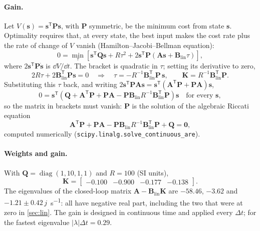 \paragraph{Gain.} Let $V(\bm s) = \bm s^{\mathsf T}\bm P\bm s$, with $\bm P$
symmetric, be the minimum cost from state $\bm s$. Optimality requires that, at
every state, the best input makes the cost rate plus the rate of change of $V$
vanish (Hamilton--Jacobi--Bellman equation):
\begin{equation}
  0 = \min_\tau\left[\bm s^{\mathsf T}\bm Q\bm s + R\tau^2
      + 2\bm s^{\mathsf T}\bm P\left(\bm A\bm s + \bm B_{\mathrm{lin}}\tau\right)\right] ,
\end{equation}
where $2\bm s^{\mathsf T}\bm P\dot{\bm s}$ is $\dd V/\dd t$. The bracket is
quadratic in $\tau$; setting its derivative to zero,
\begin{equation}
  2R\tau + 2\bm B_{\mathrm{lin}}^{\mathsf T}\bm P\bm s = 0
  \quad\Rightarrow\quad
  \tau = -R^{-1}\bm B_{\mathrm{lin}}^{\mathsf T}\bm P\,\bm s ,
  \qquad \bm K = R^{-1}\bm B_{\mathrm{lin}}^{\mathsf T}\bm P .
\end{equation}
Substituting this $\tau$ back, and writing
$2\bm s^{\mathsf T}\bm P\bm A\bm s = \bm s^{\mathsf T}(\bm A^{\mathsf T}\bm P + \bm P\bm A)\bm s$,
\begin{equation}
  0 = \bm s^{\mathsf T}\left(\bm Q + \bm A^{\mathsf T}\bm P + \bm P\bm A
      - \bm P\bm B_{\mathrm{lin}}R^{-1}\bm B_{\mathrm{lin}}^{\mathsf T}\bm P\right)\bm s
  \quad\text{for every } \bm s ,
\end{equation}
so the matrix in brackets must vanish: $\bm P$ is the solution of the
algebraic Riccati equation
\begin{equation}
  \bm A^{\mathsf T}\bm P + \bm P\bm A
  - \bm P\bm B_{\mathrm{lin}}R^{-1}\bm B_{\mathrm{lin}}^{\mathsf T}\bm P + \bm Q = \bm 0 ,
\end{equation}
computed numerically (\texttt{scipy.linalg.solve\_continuous\_are}).

\paragraph{Weights and gain.} With
$\bm Q = \operatorname{diag}(1, 10, 1, 1)$ and $R = 100$ (SI units),
\begin{equation}
  \bm K = \begin{bmatrix} -0.100 & -0.900 & -0.177 & -0.138 \end{bmatrix} .
\end{equation}
The eigenvalues of the closed-loop matrix $\bm A - \bm B_{\mathrm{lin}}\bm K$
are $-58.46$, $-3.62$ and $-1.21 \pm 0.42\,j$~\si{s^{-1}}: all have negative
real part, including the two that were at zero in \cref{sec:lin}. The gain is
designed in continuous time and applied every $\Delta t$; for the fastest
eigenvalue $|\lambda|\Delta t = 0.29$.

